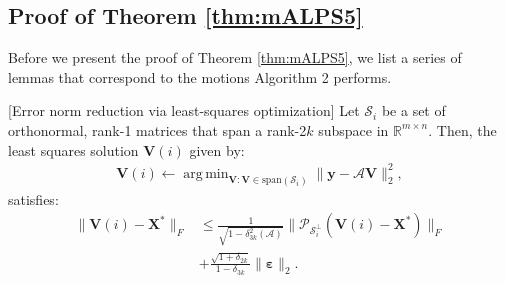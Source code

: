 \documentclass[twocolumn]{svjour3}
\newcommand{\vectornormbig}[1]{\big\|#1\big\|}
\newcommand{\obs}{\boldsymbol{y}}
\newcommand{\sensing}{\boldsymbol{\mathcal{A}}}
\newcommand{\bestsignal}{\boldsymbol{X}^\ast}
\newcommand{\noise}{\boldsymbol{\varepsilon}}
\newcommand{\dimension}{m \times n}
\newcommand{\rank}{k}
\DeclareMathOperator*{\argmin}{arg\,min}
\begin{document}
\subsection{Proof of Theorem \ref{thm:mALPS5}}

Before we present the proof of Theorem \ref{thm:mALPS5}, we list a series of lemmas that correspond to the motions Algorithm 2 performs.

\begin{lemma}{\label{lemma:greedy}}[Error norm reduction via least-squares optimization] Let $ \mathcal{S}_i $ be a set of orthonormal, rank-1 matrices that span a rank-2$ \rank $ subspace in $ \mathbb{R}^{\dimension} $. Then, the least squares solution $ \boldsymbol{V}(i) $ given by:
\begin{align}
\boldsymbol{V}(i) \leftarrow \argmin_{\boldsymbol{V}: \boldsymbol{V} \in \text{span}(\mathcal{S}_i)} \vectornormbig{\obs - \sensing \boldsymbol{V}}_2^2,  \label{eq:mALPS5:00}
\end{align} satisfies:
\begin{align}
\vectornormbig{\boldsymbol{V}(i) - \bestsignal}_F &\leq \frac{1}{\sqrt{1-\delta_{3\rank}^2(\sensing)}} \vectornormbig{\mathcal{P}_{\mathcal{S}_i^{\bot}}(\boldsymbol{V}(i) - \bestsignal)}_F \nonumber \\ &+ \frac{\sqrt{1+\delta_{2\rank}}}{1-\delta_{3\rank}} \vectornormbig{\noise}_2. \label{eq:mALPS5:01}
\end{align}
\end{lemma}
\end{document}
